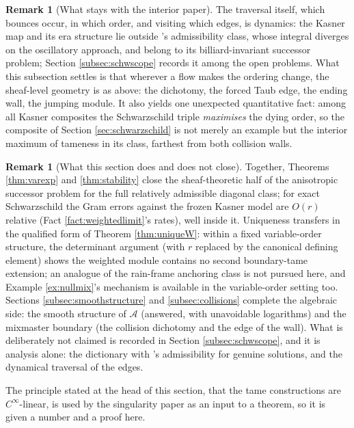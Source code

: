 \documentclass[11pt]{article}
\theoremstyle{definition}
\newtheorem{remark}[theorem]{Remark}
\begin{document}
\begin{remark}[What stays with the interior paper]\label{rem:bouncedyn}
The traversal itself, which bounces occur, in which order, and visiting which edges, is dynamics: the Kasner map and its era structure lie outside \cite{ButlerT6}'s admissibility class, whose integral diverges on the oscillatory approach, and belong to its billiard-invariant successor problem; Section \ref{subsec:schwscope} records it among the open problems. What this subsection settles is that wherever a flow makes the ordering change, the sheaf-level geometry is as above: the dichotomy, the forced Taub edge, the ending wall, the jumping module. It also yields one unexpected quantitative fact: among all Kasner composites the Schwarzschild triple \emph{maximises} the dying order, so the composite of Section \ref{sec:schwarzschild} is not merely an example but the interior maximum of tameness in its class, farthest from both collision walls.
\end{remark}

\begin{remark}[What this section does and does not close]\label{rem:anisoopen}
Together, Theorems \ref{thm:varexp} and \ref{thm:stability} close the sheaf-theoretic half of the anisotropic successor problem for the full relatively admissible diagonal class; for exact Schwarzschild the Gram errors against the frozen Kasner model are $O(r)$ relative (Fact \ref{fact:weightedlimit}'s rates), well inside it. Uniqueness transfers in the qualified form of Theorem \ref{thm:uniqueW}: within a fixed variable-order structure, the determinant argument (with $r$ replaced by the canonical defining element) shows the weighted module contains no second boundary-tame extension; an analogue of the rain-frame anchoring class is not pursued here, and Example \ref{ex:nullmix}'s mechanism is available in the variable-order setting too. Sections \ref{subsec:smoothstructure} and \ref{subsec:collisions} complete the algebraic side: the smooth structure of $\mathcal{A}$ (answered, with unavoidable logarithms) and the mixmaster boundary (the collision dichotomy and the edge of the wall). What is deliberately not claimed is recorded in Section \ref{subsec:schwscope}, and it is analysis alone: the dictionary with \cite{ButlerT6}'s admissibility for genuine solutions, and the dynamical traversal of the edges.
\end{remark}

The principle stated at the head of this section, that the tame constructions are $C^\infty$-linear, is used by the singularity paper \cite{ButlerT5} as an input to a theorem, so it is given a number and a proof here.
\end{document}
